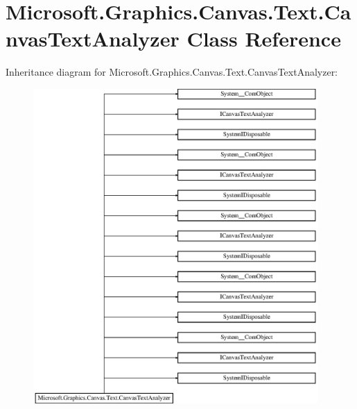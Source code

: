 \hypertarget{class_microsoft_1_1_graphics_1_1_canvas_1_1_text_1_1_canvas_text_analyzer}{}\section{Microsoft.\+Graphics.\+Canvas.\+Text.\+Canvas\+Text\+Analyzer Class Reference}
\label{class_microsoft_1_1_graphics_1_1_canvas_1_1_text_1_1_canvas_text_analyzer}
Inheritance diagram for Microsoft.\+Graphics.\+Canvas.\+Text.\+Canvas\+Text\+Analyzer\+:\begin{figure}[H]
\begin{center}
\leavevmode
\includegraphics[height=12.000000cm]{class_microsoft_1_1_graphics_1_1_canvas_1_1_text_1_1_canvas_text_analyzer}
\end{center}
\end{figure}
